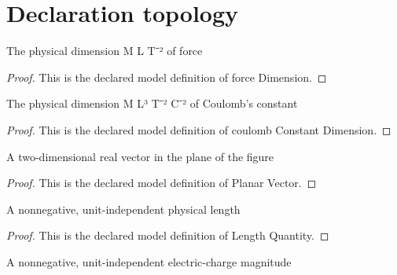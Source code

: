 \section{Declaration topology}
\begin{definition}
  \label{def:physics:phyx-mini-0893:phyxminiproblems-problemphyxmini0893-forcedimension}
  The physical dimension M L T⁻² of force
\end{definition}
\begin{proof}
  This is the declared model definition of force Dimension.
\end{proof}
\begin{definition}
  \label{def:physics:phyx-mini-0893:phyxminiproblems-problemphyxmini0893-coulombconstantdimension}
  The physical dimension M L³ T⁻² C⁻² of Coulomb's constant
\end{definition}
\begin{proof}
  This is the declared model definition of coulomb Constant Dimension.
\end{proof}
\begin{definition}
  \label{def:physics:phyx-mini-0893:phyxminiproblems-problemphyxmini0893-planarvector}
  A two-dimensional real vector in the plane of the figure
\end{definition}
\begin{proof}
  This is the declared model definition of Planar Vector.
\end{proof}
\begin{definition}
  \label{def:physics:phyx-mini-0893:phyxminiproblems-problemphyxmini0893-lengthquantity}
  A nonnegative, unit-independent physical length
\end{definition}
\begin{proof}
  This is the declared model definition of Length Quantity.
\end{proof}
\begin{definition}
  \label{def:physics:phyx-mini-0893:phyxminiproblems-problemphyxmini0893-chargemagnitudequantity}
  A nonnegative, unit-independent electric-charge magnitude
\end{definition}
